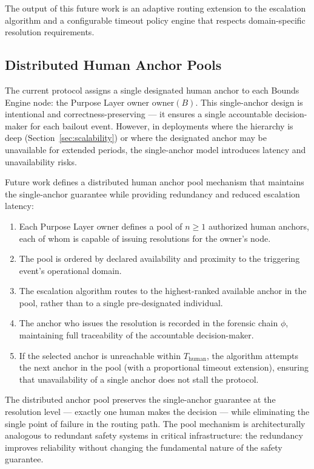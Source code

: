 The output of this future work is an adaptive routing extension to the escalation algorithm and a configurable timeout policy engine that respects domain-specific resolution requirements.

\subsection{Distributed Human Anchor Pools}
\label{sec:distributed-anchors}

The current protocol assigns a single designated human anchor to each Bounds Engine node: the Purpose Layer owner $\text{owner}(B)$. This single-anchor design is intentional and correctness-preserving — it ensures a single accountable decision-maker for each bailout event. However, in deployments where the hierarchy is deep (Section~\ref{sec:scalability}) or where the designated anchor may be unavailable for extended periods, the single-anchor model introduces latency and unavailability risks.

Future work defines a distributed human anchor pool mechanism that maintains the single-anchor guarantee while providing redundancy and reduced escalation latency:

\begin{enumerate}\setlength\itemsep{0.25em}
\item Each Purpose Layer owner defines a pool of $n \geq 1$ authorized human anchors, each of whom is capable of issuing resolutions for the owner's node.
\item The pool is ordered by declared availability and proximity to the triggering event's operational domain.
\item The escalation algorithm routes to the highest-ranked available anchor in the pool, rather than to a single pre-designated individual.
\item The anchor who issues the resolution is recorded in the forensic chain $\phi$, maintaining full traceability of the accountable decision-maker.
\item If the selected anchor is unreachable within $T_{\text{human}}$, the algorithm attempts the next anchor in the pool (with a proportional timeout extension), ensuring that unavailability of a single anchor does not stall the protocol.
\end{enumerate}

The distributed anchor pool preserves the single-anchor guarantee at the resolution level — exactly one human makes the decision — while eliminating the single point of failure in the routing path. The pool mechanism is architecturally analogous to redundant safety systems in critical infrastructure: the redundancy improves reliability without changing the fundamental nature of the safety guarantee.

